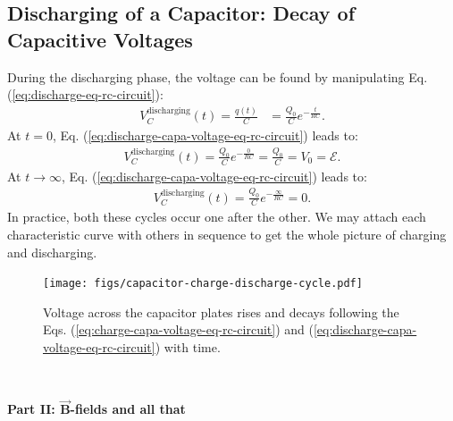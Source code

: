 \documentclass[12pt,b4paper]{article}
\begin{document}
\subsection{Discharging of a Capacitor: Decay of Capacitive Voltages}
During the discharging phase, the voltage can be found by manipulating Eq. (\ref{eq:discharge-eq-rc-circuit}):
\begin{align}
    V_C^\text{discharging}(t)=\frac{q(t)}{C}&=\frac{Q_0}{C}e^{\displaystyle-\frac{t}{RC}}.\label{eq:discharge-capa-voltage-eq-rc-circuit}
\end{align}
At $t=0$, Eq. (\ref{eq:discharge-capa-voltage-eq-rc-circuit}) leads to:
\begin{align*}
    V_C^\text{discharging}(t)=\frac{Q_0}{C}e^{\displaystyle-\frac{0}{RC}}=\frac{Q_0}{C}=V_0=\mathcal{E}.
\end{align*}
At $t\to\infty$, Eq. (\ref{eq:discharge-capa-voltage-eq-rc-circuit}) leads to:
\begin{align*}
    V_C^\text{discharging}(t)=\frac{Q_0}{C}e^{\displaystyle-\frac{\infty}{RC}}=0.
\end{align*}
In practice, both these cycles occur one after the other. We may attach each characteristic curve with others in sequence to get the whole picture of charging and discharging.
\begin{figure}[H]
    \centering
    \texttt{[image: figs/capacitor-charge-discharge-cycle.pdf]}
    \caption{Voltage across the capacitor plates rises and decays following the Eqs. (\ref{eq:charge-capa-voltage-eq-rc-circuit}) and (\ref{eq:discharge-capa-voltage-eq-rc-circuit}) with time.}
    \label{fig:rc-charging-discharging-cycle}
\end{figure}
\clearpage
\bigskip \
\vspace{10cm}
\vskip 20pt
\begin{center}
    \thispagestyle{empty}
    \huge{\selectfont \bf \sffamily Part II: $\boldsymbol{\vec{B}}$-fields and all that}
\end{center}
\vfill
\clearpage
\end{document}
